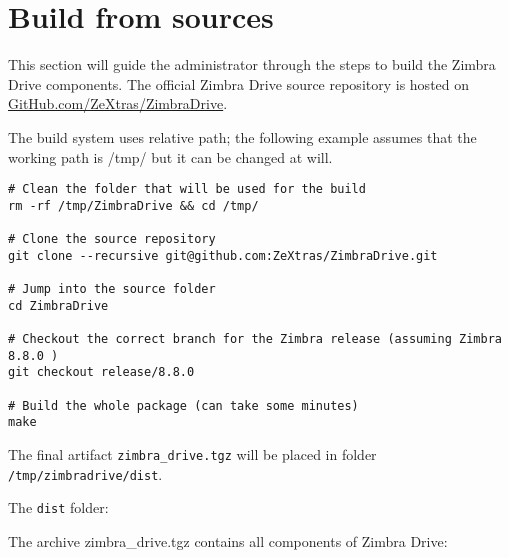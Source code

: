 \section{Build from sources}
This section will guide the administrator through the steps to build the Zimbra Drive components.
The official Zimbra Drive source repository is hosted on \href{https://github.com/ZeXtras/ZimbraDrive}{GitHub.com/ZeXtras/ZimbraDrive}.

The build system uses relative path; the following example assumes that the working path is /tmp/
but it can be changed at will.
\begin{verbatim}
# Clean the folder that will be used for the build
rm -rf /tmp/ZimbraDrive && cd /tmp/

# Clone the source repository
git clone --recursive git@github.com:ZeXtras/ZimbraDrive.git

# Jump into the source folder
cd ZimbraDrive

# Checkout the correct branch for the Zimbra release (assuming Zimbra 8.8.0 )
git checkout release/8.8.0

# Build the whole package (can take some minutes)
make
\end{verbatim}

The final artifact \texttt{zimbra\_drive.tgz} will be placed in folder \texttt{/tmp/zimbradrive/dist}.

The \texttt{dist} folder:

The archive zimbra\_drive.tgz contains all components of Zimbra Drive:

